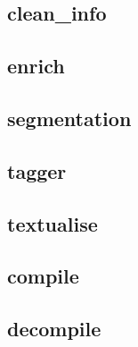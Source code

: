 \documentclass[manual-fr.tex]{subfiles}
\begin{document}
\subsection{clean\_info}


\subsection{enrich}


\subsection{segmentation}


\subsection{tagger}


\subsection{textualise}


\subsection{compile}


\subsection{decompile}

\end{document}
